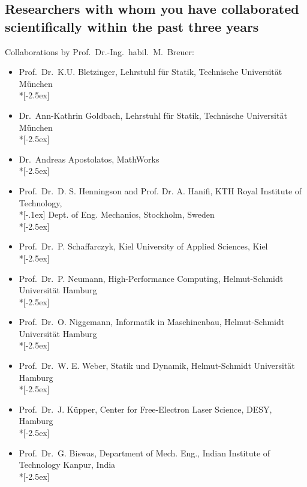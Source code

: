 \documentclass[11pt,a4paper,twoside]{scrartcl}
\begin{document}
\newpage
\subsection{Researchers with whom you have collaborated scientifically 
	within the past three years}


\quad \quad Collaborations by Prof.~Dr.-Ing.~habil.~M.~Breuer: 
\vspace{0.2cm}
\begin{itemize}
	\item Prof.\ Dr.\ K.U.  Bletzinger, Lehrstuhl f\"ur Statik,
	Technische Universit\"at M\"unchen \\*[-2.5ex]
	
	\item  Dr.\ Ann-Kathrin Goldbach, Lehrstuhl f\"ur Statik,
	Technische Universit\"at M\"unchen \\*[-2.5ex]
	
	\item  Dr.\ Andreas Apostolatos, MathWorks\\*[-2.5ex]
	
	\item Prof.\ Dr.\ D. S. Henningson and Prof. Dr. A. Hanifi, 
KTH Royal Institute of Technology,\\*[-.1ex] Dept. of Eng. Mechanics, 
Stockholm,  Sweden 
\\*[-2.5ex]
	
	\item Prof.\ Dr.\ P. Schaffarczyk, Kiel University of Applied Sciences, 
	Kiel\\*[-2.5ex]
	
	\item Prof.\ Dr.\ P. Neumann, High-Performance Computing, 
	Helmut-Schmidt Universit\"at Hamburg\\*[-2.5ex]
	\item Prof.\ Dr.\ O. Niggemann, Informatik in Maschinenbau,
	Helmut-Schmidt Universit\"at Hamburg\\*[-2.5ex]
	
		
	\item Prof.\ Dr.\ W. E. Weber, Statik und Dynamik,
	Helmut-Schmidt Universit\"at Hamburg\\*[-2.5ex]
	\item Prof.\ Dr.\ J. K\"upper, Center for Free-Electron Laser Science, 
	DESY, Hamburg\\*[-2.5ex]
		\item Prof.\ Dr.\ G. Biswas, Department of Mech. Eng., Indian Institute 
		of Technology Kanpur, India\\*[-2.5ex]
		

\end{itemize}
\end{document}
